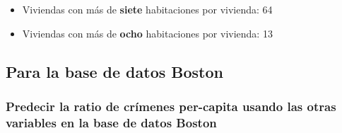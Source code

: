 \begin{itemize}

\item Viviendas con más de \textbf{siete} habitaciones por vivienda: 64

\item Viviendas con más de \textbf{ocho} habitaciones por vivienda: 13



\end{itemize}

\newpage

\subsection{Para la base de datos Boston}

\subsubsection{Predecir la ratio de crímenes per-capita usando las otras variables en la base de datos Boston}

